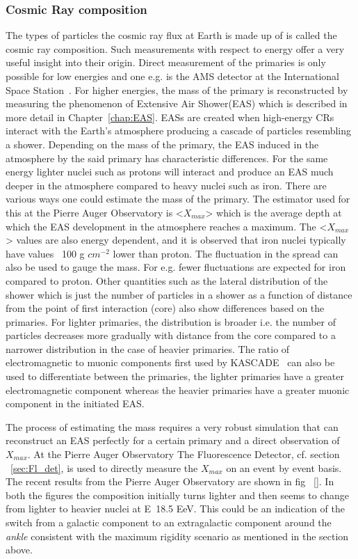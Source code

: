 \subsubsection*{Cosmic Ray composition}
\label{subsubsec:CRcompo}
The types of particles the cosmic ray flux at Earth is made up of is called the cosmic ray composition. Such measurements with respect to energy offer a very useful insight into their origin. Direct measurement of the primaries is only possible for low energies and one e.g. is the AMS detector at the International Space Station~\cite{PhysRevLett.110.141102}. For higher energies, the mass of the primary is reconstructed by measuring the phenomenon of Extensive Air Shower(EAS) which is described in more detail in Chapter~\ref{chap:EAS}. EASs are created when high-energy CRs interact with the Earth's atmosphere producing a cascade of particles resembling a shower.  Depending on the mass of the primary, the EAS induced in the atmosphere by the said primary has characteristic differences. For the same energy lighter nuclei such as protons will interact and produce an EAS much deeper in the atmosphere compared to heavy nuclei such as iron. There are various ways one could estimate the mass of the primary. The estimator used for this at the Pierre Auger Observatory is <$X_{max}$> which is the average depth at which the EAS development in the atmosphere reaches a maximum. The <$X_{max}$> values are also energy dependent, and it is observed that iron nuclei typically have values ~100 g $cm^{-2}$ lower than proton. The fluctuation in the spread can also be used to gauge the mass. For e.g. fewer fluctuations are expected for iron compared to proton. Other quantities such as the lateral distribution of the shower which is just the number of particles in a shower as a function of distance from the point of first interaction (core) also show differences based on the primaries. For lighter primaries, the distribution is broader i.e. the number of particles decreases more gradually with distance from the core compared to a narrower distribution in the case of heavier primaries. The ratio of electromagnetic to muonic components first used by KASCADE~\cite{SCHATZ1998151} can also be used to differentiate between the primaries, the lighter primaries have a greater electromagnetic component whereas the heavier primaries have a greater muonic component in the initiated EAS.    

The process of estimating the mass requires a very robust simulation that can reconstruct an EAS perfectly for a certain primary and a direct observation of $X_{max}$. At the Pierre Auger Observatory The Fluorescence Detector, cf. section ~\ref{sec:Fl_det}, is used to directly measure the $X_{max}$ on an event by event basis. The recent results from the Pierre Auger Observatory are shown in fig ~\ref{}. In both the figures the composition initially turns lighter and then seems to change from lighter to heavier nuclei at E~18.5 EeV. This could be an indication of the switch from a galactic component to an extragalactic component around the \textit{ankle} consistent with the maximum rigidity scenario as mentioned in the section above.

